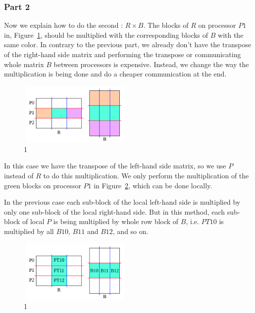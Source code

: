 \subsubsection{Part 2}

Now we explain how to do the second \mm: $R \times B$. The blocks of $R$ on processor $P1$ in, Figure~\ref{fig:part2d}, should be multiplied with the corresponding blocks of $B$ with the same color. In contrary to the previous part, we already don't have the transpose of the right-hand side matrix and performing the transpose or communicating whole matrix $B$ between processors is expensive. Instead, we change the way the multiplication is being done and do a cheaper communication at the end.

\begin{figure}[tbh]
 \centering
 \includegraphics[width=5.5cm,height=3cm]{./figures/part2d.pdf}
 \caption{1}
 \label{fig:part2d}
\end{figure}

In this case we have the transpose of the left-hand side matrix, so we use $P$ instead of $R$ to do this multiplication.
We only perform the multiplication of the green blocks on processor $P1$ in Figure~\ref{fig:part2e}, which can be done locally.

In the previous case each sub-block of the local left-hand side is multiplied by only one sub-block of the local right-hand side.
But in this method, each sub-block of local $P$ is being multiplied by whole row block of $B$, i.e. $PT10$ is multiplied by all $B10$, $B11$ and $B12$, and so on.

\begin{figure}[tbh]
 \centering
 \includegraphics[width=5.5cm,height=3cm]{./figures/part2e.pdf}
 \caption{1}
 \label{fig:part2e}
\end{figure}

